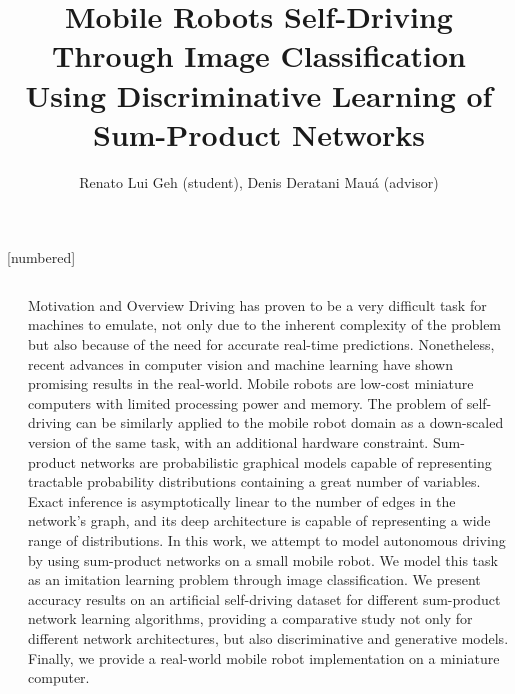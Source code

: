 \documentclass[final,hyperref={pdfpagelabels=false},notheorems]{beamer}
\title{\huge Mobile Robots Self-Driving Through Image Classification Using Discriminative Learning
of Sum-Product Networks}
\author{\Large Renato Lui Geh (student), Denis Deratani Mauá (advisor)}
\institute{\Large Institute of Mathematics and Statistics, University of São Paulo\\\vspace{4mm}
\texttt{\Large \{renatolg,ddm\}@ime.usp.br}}
\newcommand{\shrink}{-15pt}
\theoremstyle{thesisstyle}
\begin{document}
[numbered]

\begin{frame}[t]

\begin{columns}[t]
  \begin{column}{.015\textwidth}\end{column} %


  \begin{column}{.5225\textwidth}

    \vspace{\shrink}
    \begin{block}{Motivation and Overview}
      Driving has proven to be a very difficult task for machines to emulate, not only due to the
      inherent complexity of the problem but also because of the need for accurate real-time
      predictions.  Nonetheless, recent advances in computer vision and machine learning have shown
      promising results in the real-world. Mobile robots are low-cost miniature computers with
      limited processing power and memory. The problem of self-driving can be similarly applied to
      the mobile robot domain as a down-scaled version of the same task, with an additional
      hardware constraint. Sum-product networks are probabilistic graphical models capable of
      representing tractable probability distributions containing a great number of variables.
      Exact inference is asymptotically linear to the number of edges in the network's graph, and
      its deep architecture is capable of representing a wide range of distributions. In this work,
      we attempt to model autonomous driving by using sum-product networks on a small mobile robot.
      We model this task as an imitation learning problem through image classification. We present
      accuracy results on an artificial self-driving dataset for different sum-product network
      learning algorithms, providing a comparative study not only for different network
      architectures, but also discriminative and generative models. Finally, we provide a
      real-world mobile robot implementation on a miniature computer.
    \end{block}


\end{column}
\end{columns}
\end{frame}
\end{document}
